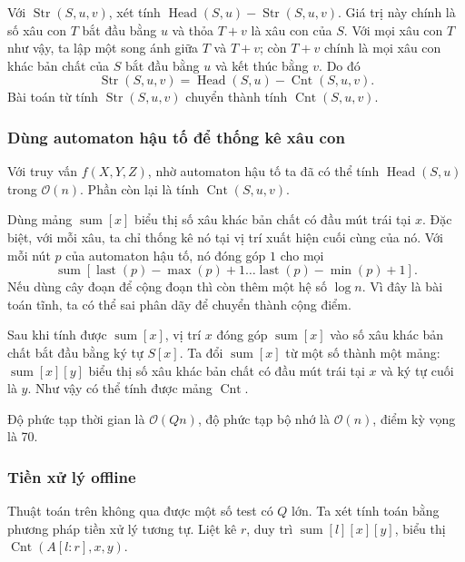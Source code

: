\documentclass[11pt]{article}
\newcommand{\Oh}{\mathcal{O}}
\begin{document}
Với \(\operatorname{Str}(S,u,v)\), xét tính
\(\operatorname{Head}(S,u)-\operatorname{Str}(S,u,v)\). Giá trị này chính là
số xâu con \(T\) bắt đầu bằng \(u\) và thỏa \(T+v\) là xâu con của \(S\). Với
mọi xâu con \(T\) như vậy, ta lập một song ánh giữa \(T\) và \(T+v\); còn
\(T+v\) chính là mọi xâu con khác bản chất của \(S\) bắt đầu bằng \(u\) và kết
thúc bằng \(v\). Do đó
\[
  \operatorname{Str}(S,u,v)=\operatorname{Head}(S,u)-\operatorname{Cnt}(S,u,v).
\]
Bài toán từ tính \(\operatorname{Str}(S,u,v)\) chuyển thành tính
\(\operatorname{Cnt}(S,u,v)\).

\subsubsection{Dùng automaton hậu tố để thống kê xâu con}

Với truy vấn \(f(X,Y,Z)\), nhờ automaton hậu tố ta đã có thể tính
\(\operatorname{Head}(S,u)\) trong \(\Oh(n)\). Phần còn lại là tính
\(\operatorname{Cnt}(S,u,v)\).

Dùng mảng \(\operatorname{sum}[x]\) biểu thị số xâu khác bản chất có đầu mút
trái tại \(x\). Đặc biệt, với mỗi xâu, ta chỉ thống kê nó tại vị trí xuất hiện
cuối cùng của nó. Với mỗi nút \(p\) của automaton hậu tố, nó đóng góp \(1\) cho
mọi
\[
  \operatorname{sum}[\operatorname{last}(p)-\max(p)+1\ldots
  \operatorname{last}(p)-\min(p)+1].
\]
Nếu dùng cây đoạn để cộng đoạn thì còn thêm một hệ số \(\log n\). Vì đây là
bài toán tĩnh, ta có thể sai phân dãy để chuyển thành cộng điểm.

Sau khi tính được \(\operatorname{sum}[x]\), vị trí \(x\) đóng góp
\(\operatorname{sum}[x]\) vào số xâu khác bản chất bắt đầu bằng ký tự \(S[x]\).
Ta đổi \(\operatorname{sum}[x]\) từ một số thành một mảng:
\(\operatorname{sum}[x][y]\) biểu thị số xâu khác bản chất có đầu mút trái tại
\(x\) và ký tự cuối là \(y\). Như vậy có thể tính được mảng
\(\operatorname{Cnt}\).

Độ phức tạp thời gian là \(\Oh(Qn)\), độ phức tạp bộ nhớ là \(\Oh(n)\), điểm
kỳ vọng là 70.

\subsubsection{Tiền xử lý offline}

Thuật toán trên không qua được một số test có \(Q\) lớn. Ta xét tính toán bằng
phương pháp tiền xử lý tương tự. Liệt kê \(r\), duy trì
\(\operatorname{sum}[l][x][y]\), biểu thị
\(\operatorname{Cnt}(A[l:r],x,y)\).
\end{document}
